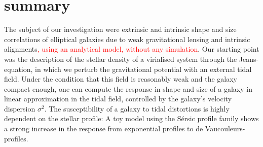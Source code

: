 \documentclass[a4paper,fleqn,usenatbib]{mnras}
\newcommand\foca[1]{\textcolor{red}{#1}}
\begin{document}
\section{summary}\label{sect_summary}
The subject of our investigation were extrinsic and intrinsic shape and size correlations of elliptical galaxies due to weak gravitational lensing and intrinsic alignments\foca{, using an analytical model, without any simulation}. Our starting point was the description of the stellar density of a virialised system through the Jeans-equation, in which we perturb the gravitational potential with an external tidal  field. Under the condition that this field is reasonably weak and the galaxy compact enough, one can compute the response in shape and size of a galaxy in linear approximation in the tidal field,  controlled by the galaxy's velocity dispersion $\sigma^2$. The susceptibility of a galaxy to tidal distortions is highly dependent on the stellar profile: A toy model using the S{\'e}rsic profile family shows a strong increase in the response from exponential profiles to de Vaucouleurs-profiles.
\end{document}
